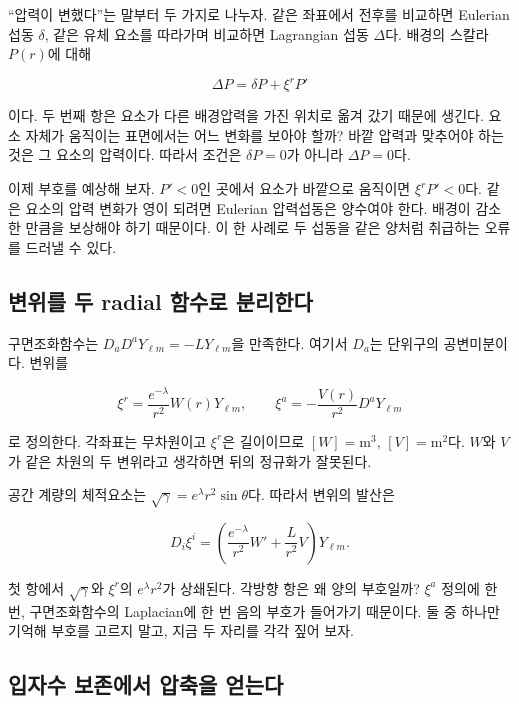 \documentclass[
  10pt,
  a4paper,
]{article}
\begin{document}
``압력이 변했다''는 말부터 두 가지로 나누자. 같은 좌표에서 전후를
비교하면 Eulerian 섭동 \(\delta\), 같은 유체 요소를 따라가며 비교하면
Lagrangian 섭동 \(\Delta\)다. 배경의 스칼라 \(P(r)\)에 대해

\[
\Delta P=\delta P+\xi^r P'
\]

이다. 두 번째 항은 요소가 다른 배경압력을 가진 위치로 옮겨 갔기 때문에
생긴다. 요소 자체가 움직이는 표면에서는 어느 변화를 보아야 할까? 바깥
압력과 맞추어야 하는 것은 그 요소의 압력이다. 따라서 조건은
\(\delta P=0\)가 아니라 \(\Delta P=0\)다.

이제 부호를 예상해 보자. \(P'<0\)인 곳에서 요소가 바깥으로 움직이면
\(\xi^rP'<0\)다. 같은 요소의 압력 변화가 영이 되려면 Eulerian 압력섭동은
양수여야 한다. 배경이 감소한 만큼을 보상해야 하기 때문이다. 이 한 사례로
두 섭동을 같은 양처럼 취급하는 오류를 드러낼 수 있다.

\subsection{변위를 두 radial 함수로
분리한다}\label{uxbcc0uxc704uxb97c-uxb450-radial-uxd568uxc218uxb85c-uxbd84uxb9acuxd55cuxb2e4}

구면조화함수는 \(D_aD^aY_{\ell m}=-LY_{\ell m}\)을 만족한다. 여기서
\(D_a\)는 단위구의 공변미분이다. 변위를

\[
\xi^r=\frac{e^{-\lambda}}{r^2}W(r)Y_{\ell m},
\qquad
\xi^a=-\frac{V(r)}{r^2}D^aY_{\ell m}
\]

로 정의한다. 각좌표는 무차원이고 \(\xi^r\)은 길이이므로
\([W]=\mathrm{m^3}\), \([V]=\mathrm{m^2}\)다. \(W\)와 \(V\)가 같은
차원의 두 변위라고 생각하면 뒤의 정규화가 잘못된다.

공간 계량의 체적요소는 \(\sqrt\gamma=e^\lambda r^2\sin\theta\)다. 따라서
변위의 발산은

\[
D_i\xi^i=
\left(\frac{e^{-\lambda}}{r^2}W'+\frac{L}{r^2}V\right)Y_{\ell m}.
\]

첫 항에서 \(\sqrt\gamma\)와 \(\xi^r\)의 \(e^\lambda r^2\)가 상쇄된다.
각방향 항은 왜 양의 부호일까? \(\xi^a\) 정의에 한 번, 구면조화함수의
Laplacian에 한 번 음의 부호가 들어가기 때문이다. 둘 중 하나만 기억해
부호를 고르지 말고, 지금 두 자리를 각각 짚어 보자.

\subsection{입자수 보존에서 압축을
얻는다}\label{uxc785uxc790uxc218-uxbcf4uxc874uxc5d0uxc11c-uxc555uxcd95uxc744-uxc5bbuxb294uxb2e4}
\end{document}
